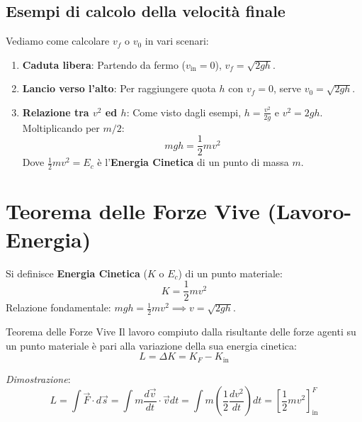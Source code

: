 \subsection{Esempi di calcolo della velocità finale}
Vediamo come calcolare $v_f$ o $v_0$ in vari scenari:
\begin{enumerate}
    \item \textbf{Caduta libera}: Partendo da fermo ($v_{\text{in}}=0$), $v_f = \sqrt{2gh}$.
    \item \textbf{Lancio verso l'alto}: Per raggiungere quota $h$ con $v_f=0$, serve $v_0 = \sqrt{2gh}$.
    \item \textbf{Relazione tra $v^2$ ed $h$}: Come visto dagli esempi, $h = \frac{v^2}{2g}$ e $v^2 = 2gh$. Moltiplicando per $m/2$:
    \begin{equation}
        mgh = \frac{1}{2} m v^2
    \end{equation}
    Dove $\frac{1}{2}mv^2 = E_c$ è l'\textbf{Energia Cinetica} di un punto di massa $m$.
\end{enumerate}

\section{Teorema delle Forze Vive (Lavoro-Energia)}
Si definisce \textbf{Energia Cinetica} ($K$ o $E_c$) di un punto materiale:
\begin{equation}
    K = \frac{1}{2} m v^2
\end{equation}
Relazione fondamentale: $mgh = \frac{1}{2} m v^2 \implies v = \sqrt{2gh}$.

\begin{teorema}{Teorema delle Forze Vive}
Il lavoro compiuto dalla risultante delle forze agenti su un punto materiale è pari alla variazione della sua energia cinetica:
\begin{equation}
    L = \Delta K = K_F - K_{\text{in}}
\end{equation}
\end{teorema}

\textit{Dimostrazione}:
\begin{equation}
    L = \int \vec{F} \cdot d\vec{s} = \int m \frac{d\vec{v}}{dt} \cdot \vec{v} dt = \int m \left( \frac{1}{2} \frac{d v^2}{dt} \right) dt = \left[ \frac{1}{2} m v^2 \right]_{\text{in}}^F
\end{equation}

